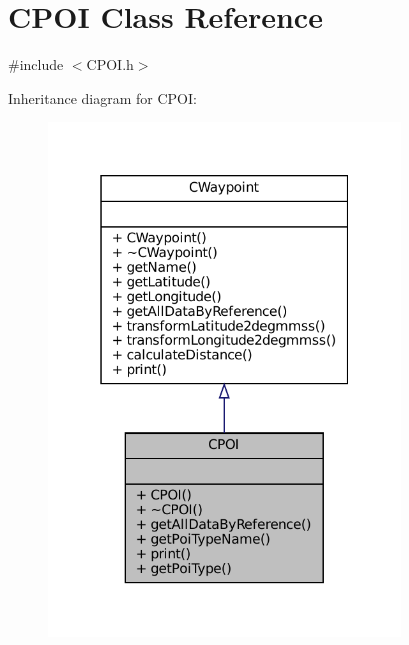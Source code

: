 \hypertarget{classCPOI}{}\section{C\+P\+OI Class Reference}
\label{classCPOI}


{\ttfamily \#include $<$C\+P\+O\+I.\+h$>$}



Inheritance diagram for C\+P\+OI\+:
\nopagebreak
\begin{figure}[H]
\begin{center}
\leavevmode
\includegraphics[width=265pt]{classCPOI__inherit__graph}
\end{center}
\end{figure}


